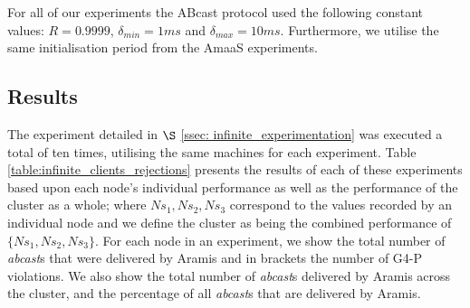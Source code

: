     For all of our experiments the \textsf{ABcast} protocol used the following constant values: $R = 0.9999$, $\delta_{min} = 1ms$ and $\delta_{max} = 10ms$.  Furthermore, we utilise the same initialisation period from the \textsf{AmaaS} experiments.  
    
    \subsection{Results}
The experiment detailed in $\S$ \ref{ssec: infinite_experimentation} was executed a total of ten times, utilising the same machines for each experiment.  Table \ref{table:infinite_clients_rejections} presents the results of each of these experiments based upon each node's individual performance as well as the performance of the cluster as a whole; where $Ns_1, Ns_2, Ns_3$ correspond to the values recorded by an individual node and we define the cluster as being the combined performance of $\{Ns_1,Ns_2,Ns_3\}$.  For each node in an experiment, we show the total number of \emph{abcast}s that were delivered by \textsf{Aramis} and in brackets the number of G4-P violations.  We also show the total number of \emph{abcast}s delivered by \textsf{Aramis} across the cluster, and the percentage of all \emph{abcast}s that are delivered by \textsf{Aramis}.  
    
